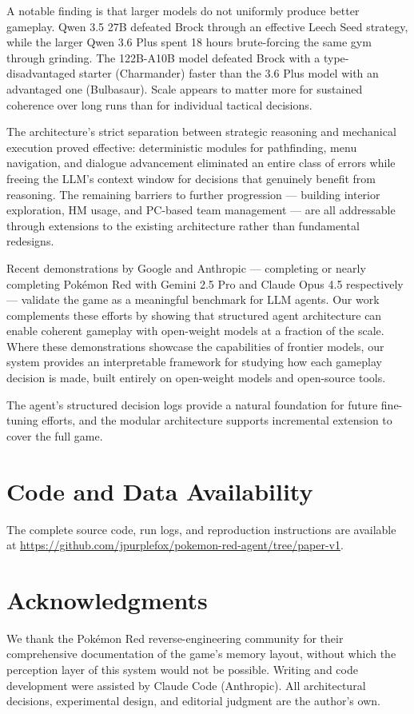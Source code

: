\documentclass{article}
\begin{document}
A notable finding is that larger models do not uniformly produce better gameplay. Qwen 3.5 27B defeated Brock through an effective Leech Seed strategy, while the larger Qwen 3.6 Plus spent 18 hours brute-forcing the same gym through grinding. The 122B-A10B model defeated Brock with a type-disadvantaged starter (Charmander) faster than the 3.6 Plus model with an advantaged one (Bulbasaur). Scale appears to matter more for sustained coherence over long runs than for individual tactical decisions.

The architecture's strict separation between strategic reasoning and mechanical execution proved effective: deterministic modules for pathfinding, menu navigation, and dialogue advancement eliminated an entire class of errors while freeing the LLM's context window for decisions that genuinely benefit from reasoning. The remaining barriers to further progression --- building interior exploration, HM usage, and PC-based team management --- are all addressable through extensions to the existing architecture rather than fundamental redesigns.

Recent demonstrations by Google and Anthropic --- completing or nearly completing Pok\'{e}mon Red with Gemini 2.5 Pro and Claude Opus 4.5 respectively --- validate the game as a meaningful benchmark for LLM agents. Our work complements these efforts by showing that structured agent architecture can enable coherent gameplay with open-weight models at a fraction of the scale. Where these demonstrations showcase the capabilities of frontier models, our system provides an interpretable framework for studying how each gameplay decision is made, built entirely on open-weight models and open-source tools.

The agent's structured decision logs provide a natural foundation for future fine-tuning efforts, and the modular architecture supports incremental extension to cover the full game.


\section*{Code and Data Availability}

The complete source code, run logs, and reproduction instructions are available at \url{https://github.com/jpurplefox/pokemon-red-agent/tree/paper-v1}.

\section*{Acknowledgments}

We thank the Pok\'{e}mon Red reverse-engineering community for their comprehensive documentation of the game's memory layout, without which the perception layer of this system would not be possible. Writing and code development were assisted by Claude Code (Anthropic). All architectural decisions, experimental design, and editorial judgment are the author's own.



\end{document}
